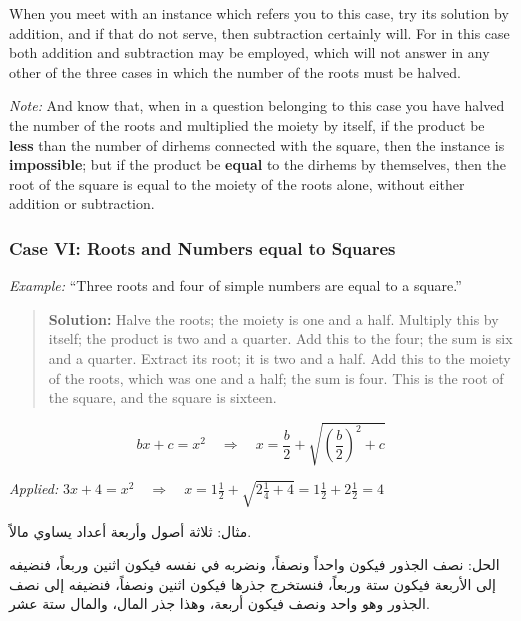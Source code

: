 \documentclass[11pt,a4paper,openany,oneside]{book}
\newcommand{\cnote}[1]{\textcolor{notecolor}{\textit{#1}}}
\begin{document}
When you meet with an instance which refers you to this case, try its
solution by addition, and if that do not serve, then subtraction certainly
will. For in this case both addition and subtraction may be employed, which
will not answer in any other of the three cases in which the number of the
roots must be halved.

\cnote{Note:} And know that, when in a question belonging to this case you
have halved the number of the roots and multiplied the moiety by itself, if
the product be \textbf{less} than the number of dirhems connected with the
square, then the instance is \textbf{impossible}; but if the product be
\textbf{equal} to the dirhems by themselves, then the root of the square is
equal to the moiety of the roots alone, without either addition or
subtraction.

\subsubsection*{Case VI: Roots and Numbers equal to Squares}

\textit{Example:} ``Three roots and four of simple numbers are equal to a
square.''

\begin{quote}
\textbf{Solution:} Halve the roots; the moiety is one and a half. Multiply
this by itself; the product is two and a quarter. Add this to the four; the
sum is six and a quarter. Extract its root; it is two and a half. Add this
to the moiety of the roots, which was one and a half; the sum is four. This
is the root of the square, and the square is sixteen.
\end{quote}

\begin{mathbox}[title={\textbf{The Algorithm for Case VI}}]
\begin{equation}
bx + c = x^2 \quad\Longrightarrow\quad x = \frac{b}{2} + \sqrt{\left(\frac{b}{2}\right)^2 + c}
\end{equation}

\textit{Applied:} $3x + 4 = x^2 \quad\Rightarrow\quad x = 1\tfrac{1}{2} + \sqrt{2\tfrac{1}{4} + 4} = 1\tfrac{1}{2} + 2\tfrac{1}{2} = 4$
\end{mathbox}

\begin{arabicbox}
\begin{Arabic}
مثال: ثلاثة أصول وأربعة أعداد يساوي مالاً.

الحل: نصف الجذور فيكون واحداً ونصفاً، ونضربه في نفسه فيكون
اثنين وربعاً، فنضيفه إلى الأربعة فيكون ستة وربعاً، فنستخرج
جذرها فيكون اثنين ونصفاً، فنضيفه إلى نصف الجذور وهو واحد
ونصف فيكون أربعة، وهذا جذر المال، والمال ستة عشر.
\end{Arabic}
\end{arabicbox}
\end{document}
